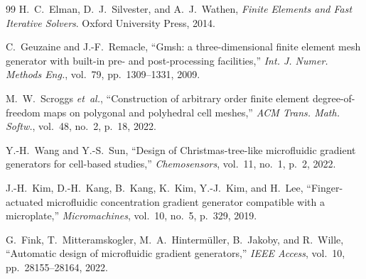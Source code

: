 \begin{thebibliography}{99}
H.~C.~Elman, D.~J.~Silvester, and A.~J.~Wathen,
\emph{Finite Elements and Fast Iterative Solvers}. Oxford University Press, 2014.

C.~Geuzaine and J.-F.~Remacle,
``{G}msh: a three-dimensional finite element mesh generator with built-in pre- and post-processing facilities,''
\emph{Int. J. Numer. Methods Eng.}, vol.~79, pp.~1309--1331, 2009.

M.~W.~Scroggs \emph{et~al.},
``Construction of arbitrary order finite element degree-of-freedom maps on polygonal and polyhedral cell meshes,''
\emph{ACM Trans. Math. Softw.}, vol.~48, no.~2, p.~18, 2022.


Y.-H.~Wang and Y.-S.~Sun,
``Design of Christmas-tree-like microfluidic gradient generators for cell-based studies,''
\emph{Chemosensors}, vol.~11, no.~1, p.~2, 2022.

J.-H.~Kim, D.-H.~Kang, B.~Kang, K.~Kim, Y.-J.~Kim, and H.~Lee,
``Finger-actuated microfluidic concentration gradient generator compatible with a microplate,''
\emph{Micromachines}, vol.~10, no.~5, p.~329, 2019.

G.~Fink, T.~Mitteramskogler, M.~A.~Hinterm\"{u}ller, B.~Jakoby, and R.~Wille,
``Automatic design of microfluidic gradient generators,''
\emph{IEEE Access}, vol.~10, pp.~28155--28164, 2022.

\end{thebibliography}
